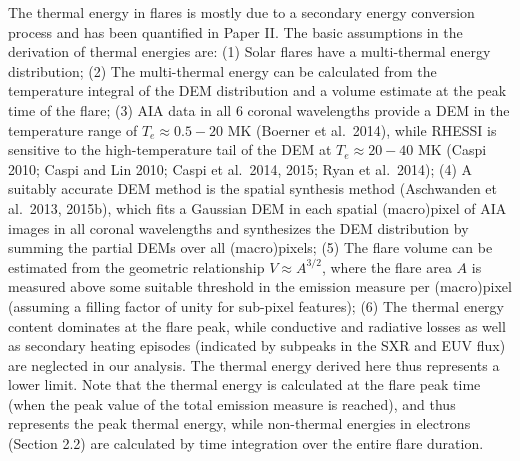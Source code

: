 \documentclass[10pt,preprint]{aastex}  %
\begin{document}
The thermal energy in flares is mostly due to a secondary 
energy conversion process and has been quantified in Paper II.
The basic assumptions in the derivation of thermal energies are:
(1) Solar flares have a multi-thermal energy distribution;
(2) The multi-thermal energy can be calculated from the
temperature integral of the DEM distribution and a volume
estimate at the peak time of the flare;
(3) AIA data in all 6 coronal wavelengths provide a DEM in the
temperature range of $T_e \approx 0.5-20$ MK (Boerner et al.~2014),
while RHESSI is sensitive to the high-temperature tail of the 
DEM at $T_e \approx 20-40$ MK (Caspi 2010; Caspi and Lin 2010; 
Caspi et al.~2014, 2015; Ryan et al.~2014); 
(4) A suitably accurate DEM method is the spatial synthesis 
method (Aschwanden et al.~2013, 2015b),
which fits a Gaussian DEM in each spatial (macro)pixel
of AIA images in all coronal wavelengths and synthesizes the
DEM distribution by summing the partial DEMs over all (macro)pixels;
(5) The flare volume can be estimated from the geometric
relationship $V \approx A^{3/2}$, where the flare area $A$ is
measured above some suitable threshold in the emission measure
per (macro)pixel (assuming a filling factor of unity for
sub-pixel features);
(6) The thermal energy content dominates at the flare peak,
while conductive and radiative losses as well as secondary
heating episodes (indicated by subpeaks in the SXR and
EUV flux) are neglected in our analysis. The thermal energy
derived here thus represents a lower limit. 
Note that the thermal energy is calculated at the flare peak 
time (when the peak value of the total emission measure is
reached), and thus represents the peak thermal energy,
while non-thermal energies in electrons (Section 2.2) are 
calculated by time integration over the entire flare duration.
\end{document}
